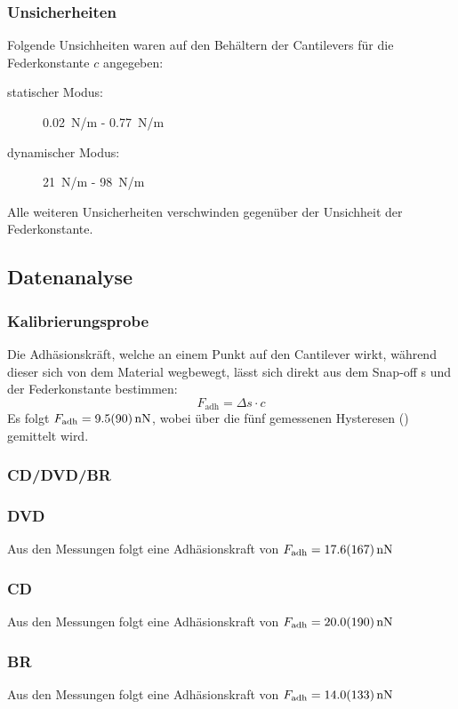 \documentclass[
	a4paper,
	12pt,
	pagesize,
	ngerman
]{scrartcl}
\begin{document}
	\subsubsection{Unsicherheiten} %
	Folgende Unsichheiten waren auf den Behältern der Cantilevers für die Federkonstante $c$ angegeben:
	\begin{description}
		\item[statischer Modus:] \SI{0.02}{N/m} - \SI{0.77}{N/m} %
		\item[dynamischer Modus:] \SI{21}{N/m} - \SI{98}{N/m}
	\end{description}
	Alle weiteren Unsicherheiten verschwinden gegenüber der Unsichheit der Federkonstante.
	\subsection{Datenanalyse}
	\subsubsection{Kalibrierungsprobe}
	Die Adhäsionskräft, welche an einem Punkt auf den Cantilever wirkt, während dieser sich von dem Material wegbewegt, lässt sich direkt aus dem Snap-off s und der Federkonstante bestimmen:
	\begin{equation}
			F_\text{adh} = \Delta s \cdot c
	\end{equation}
	Es folgt $F_\text{adh}=\SI{9.5+-9.0}{nN}$, wobei über die fünf gemessenen Hysteresen () gemittelt wird.
	\subsubsection{CD/DVD/BR}
	\subsubsection*{DVD}
	Aus den Messungen  folgt eine Adhäsionskraft von $F_\text{adh}=\SI{17.6+-16.7}{nN}$
	\subsubsection*{CD}
	Aus den Messungen  folgt eine Adhäsionskraft von $F_\text{adh}=\SI{20.0+-19.0}{nN}$
	\subsubsection*{BR}
	Aus den Messungen  folgt eine Adhäsionskraft von $F_\text{adh}=\SI{14.0+-13.3}{nN}$
\end{document}
